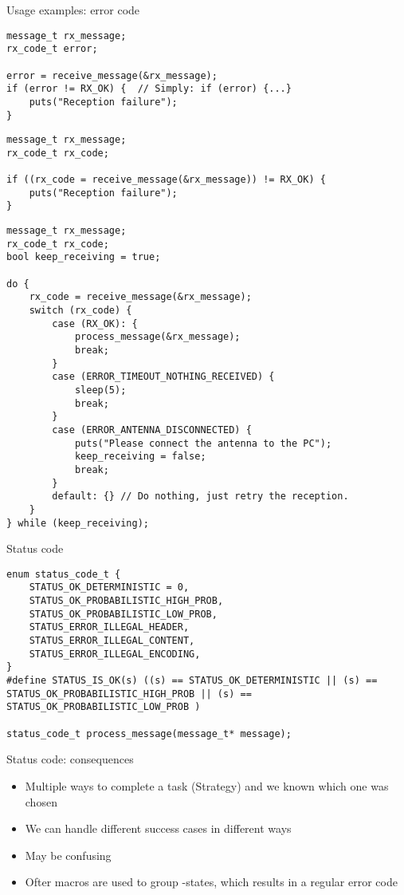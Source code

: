\documentclass[aspectratio=169,14pt]{beamer}
\begin{document}
\begin{frame}[fragile]{Usage examples: error code}
\begin{lstlisting}[style=cstyle]
message_t rx_message;
rx_code_t error;

error = receive_message(&rx_message);
if (error != RX_OK) {  // Simply: if (error) {...}
    puts("Reception failure");
}
\end{lstlisting}

\begin{lstlisting}[style=cstyle]
message_t rx_message;
rx_code_t rx_code;

if ((rx_code = receive_message(&rx_message)) != RX_OK) {
    puts("Reception failure");
}
\end{lstlisting}
\end{frame}

\begin{frame}[fragile]{}
\begin{lstlisting}[style=cstyle,basicstyle=\scriptsize\ttfamily]
message_t rx_message;
rx_code_t rx_code;
bool keep_receiving = true;

do {
    rx_code = receive_message(&rx_message);
    switch (rx_code) {
        case (RX_OK): {
            process_message(&rx_message);
            break;
        }
        case (ERROR_TIMEOUT_NOTHING_RECEIVED) {
            sleep(5);
            break;
        }
        case (ERROR_ANTENNA_DISCONNECTED) {
            puts("Please connect the antenna to the PC");
            keep_receiving = false;
            break;
        }
        default: {} // Do nothing, just retry the reception.
    }
} while (keep_receiving);
\end{lstlisting}
\end{frame}


\begin{frame}[fragile]{Status code}
\begin{lstlisting}[style=cstyle]
enum status_code_t {
    STATUS_OK_DETERMINISTIC = 0,
    STATUS_OK_PROBABILISTIC_HIGH_PROB,
    STATUS_OK_PROBABILISTIC_LOW_PROB,
    STATUS_ERROR_ILLEGAL_HEADER,
    STATUS_ERROR_ILLEGAL_CONTENT,
    STATUS_ERROR_ILLEGAL_ENCODING,
}
#define STATUS_IS_OK(s) ((s) == STATUS_OK_DETERMINISTIC || (s) == STATUS_OK_PROBABILISTIC_HIGH_PROB || (s) == STATUS_OK_PROBABILISTIC_LOW_PROB )

status_code_t process_message(message_t* message);
\end{lstlisting}
\end{frame}


\begin{frame}[fragile]{Status code: consequences}
\begin{itemize}
    \item Multiple ways to complete a task (Strategy) and we known which one was chosen
    \item We can handle different success cases in different ways
    \item May be confusing
    \item Ofter macros are used to group -states, which results in a regular error code
\end{itemize}
\end{frame}
\end{document}
